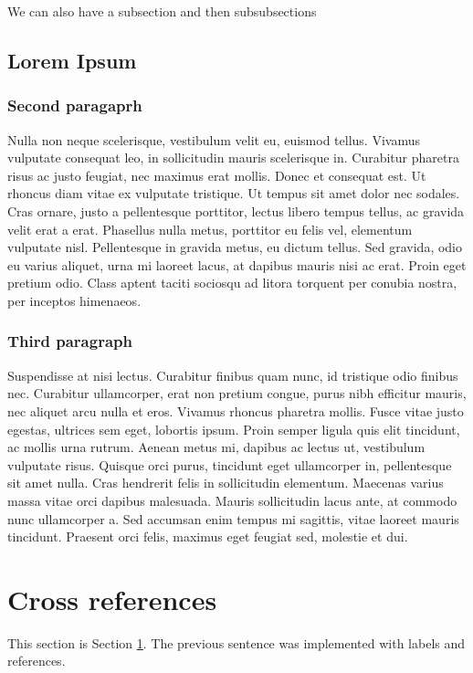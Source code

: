 \documentclass[11pt]{article}
\begin{document}
We can also have a subsection and then subsubsections

\subsection{Lorem Ipsum}
\subsubsection{Second paragaprh}
Nulla non neque scelerisque, vestibulum velit eu, euismod tellus. Vivamus vulputate consequat leo, in sollicitudin mauris scelerisque in. Curabitur pharetra risus ac justo feugiat, nec maximus erat mollis. Donec et consequat est. Ut rhoncus diam vitae ex vulputate tristique. Ut tempus sit amet dolor nec sodales. Cras ornare, justo a pellentesque porttitor, lectus libero tempus tellus, ac gravida velit erat a erat. Phasellus nulla metus, porttitor eu felis vel, elementum vulputate nisl. Pellentesque in gravida metus, eu dictum tellus. Sed gravida, odio eu varius aliquet, urna mi laoreet lacus, at dapibus mauris nisi ac erat. Proin eget pretium odio. Class aptent taciti sociosqu ad litora torquent per conubia nostra, per inceptos himenaeos.

\subsubsection{Third paragraph}
Suspendisse at nisi lectus. Curabitur finibus quam nunc, id tristique odio finibus nec. Curabitur ullamcorper, erat non pretium congue, purus nibh efficitur mauris, nec aliquet arcu nulla et eros. Vivamus rhoncus pharetra mollis. Fusce vitae justo egestas, ultrices sem eget, lobortis ipsum. Proin semper ligula quis elit tincidunt, ac mollis urna rutrum. Aenean metus mi, dapibus ac lectus ut, vestibulum vulputate risus. Quisque orci purus, tincidunt eget ullamcorper in, pellentesque sit amet nulla. Cras hendrerit felis in sollicitudin elementum. Maecenas varius massa vitae orci dapibus malesuada. Mauris sollicitudin lacus ante, at commodo nunc ullamcorper a. Sed accumsan enim tempus mi sagittis, vitae laoreet mauris tincidunt. Praesent orci felis, maximus eget feugiat sed, molestie et dui.

\section{Cross references}\label{sec:xref}
This section is Section \ref{sec:xref}.
The previous sentence was implemented with labels and references.
\end{document}
